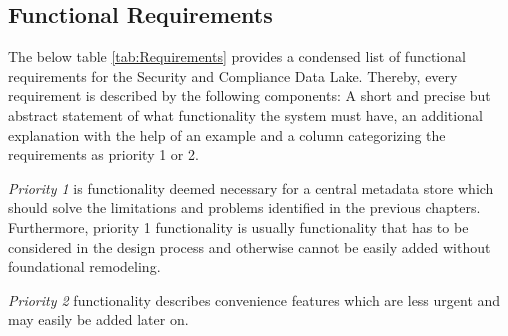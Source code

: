 \subsection{Functional Requirements}
The below table \ref{tab:Requirements} provides a condensed list of functional requirements for the Security and Compliance Data Lake. Thereby, every requirement is described by the following components: A short and precise but abstract statement of what functionality the system must have, an additional explanation with the help of an example and a column categorizing the requirements as priority 1 or 2.\par 
\emph{Priority 1} is functionality deemed necessary for a central metadata store which should solve the limitations and problems identified in the previous chapters. Furthermore, priority 1 functionality is usually functionality that has to be considered in the design process and otherwise cannot be easily added without foundational remodeling.\par
\emph{Priority 2} functionality describes convenience features which are less urgent and may easily be added later on.
